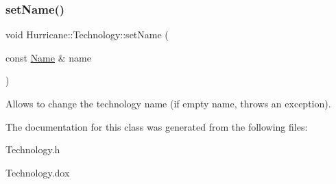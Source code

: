 \subsubsection{\texorpdfstring{set\+Name()}{setName()}}
{\footnotesize\ttfamily void Hurricane\+::\+Technology\+::set\+Name (\begin{DoxyParamCaption}\item[{const \hyperlink{classHurricane_1_1Name}{Name} \&}]{name }\end{DoxyParamCaption})}

Allows to change the technology name (if empty name, throws an exception). 

The documentation for this class was generated from the following files\+:\begin{DoxyCompactItemize}
\item 
Technology.\+h\item 
Technology.\+dox\end{DoxyCompactItemize}
